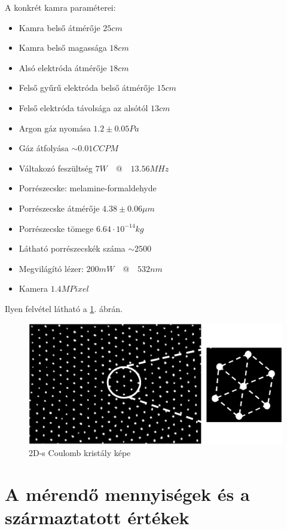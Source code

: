 	A konkrét kamra paraméterei:
	\begin{itemize}
		\item Kamra belső átmérője $25cm$
		\item Kamra belső magassága $18cm$
		\item Alsó elektróda átmérője $18cm$
		\item Felső gyűrű elektróda belső átmérője $15cm$
		\item Felső elektróda távolsága az alsótól $13cm$
		\item Argon gáz nyomása $1.2\pm0.05 Pa$
		\item Gáz átfolyása $\sim 0.01 CCPM$
		\item Váltakozó feszültség $7W\quad @ \quad 13.56 MHz$
		\item Porrészecske: melamine-formaldehyde
		\item Porrészecske átmérője $4.38\pm 0.06 \mu m$
		\item Porrészecske tömege $6.64\cdot10^{-14} kg$
		\item Látható porrészecskék száma $\sim 2500$
		\item Megvilágító lézer: $200mW\quad @ \quad 532nm$
		\item Kamera $1.4MPixel$
	\end{itemize}
	Ilyen felvétel látható a \ref{fig:measurement}. ábrán. 	
	
	\begin{figure}[!h]
		\centering
		\includegraphics[width=0.9\columnwidth]{figures/eps/coulomb_crystal.eps}
		\caption{2D-s Coulomb kristály képe} 
		\label{fig:measurement} 
	\end{figure}

\section{A mérendő mennyiségek és a származtatott értékek}
	









